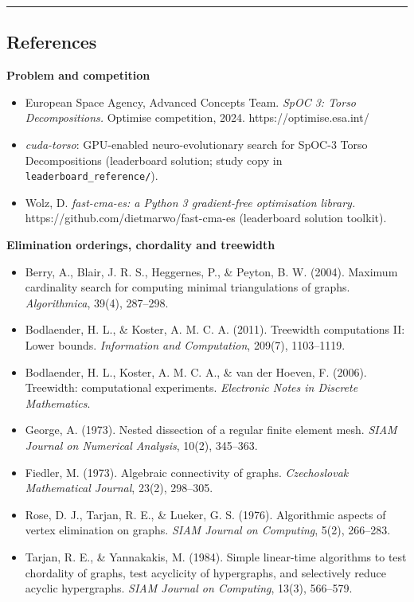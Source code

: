 \documentclass[
  11pt,
]{article}
\providecommand{\tightlist}{%
  \setlength{\itemsep}{0pt}\setlength{\parskip}{0pt}}
\begin{document}
\begin{center}\rule{0.5\linewidth}{0.5pt}\end{center}

\hypertarget{references}{%
\subsection{References}\label{references}}

\textbf{Problem and competition}

\begin{itemize}
\tightlist
\item
  European Space Agency, Advanced Concepts Team. \emph{SpOC 3: Torso
  Decompositions.} Optimise competition, 2024. https://optimise.esa.int/
\item
  \emph{cuda-torso}: GPU-enabled neuro-evolutionary search for SpOC-3
  Torso Decompositions (leaderboard solution; study copy in
  \texttt{leaderboard\_reference/}).
\item
  Wolz, D. \emph{fast-cma-es: a Python 3 gradient-free optimisation
  library.} https://github.com/dietmarwo/fast-cma-es (leaderboard
  solution toolkit).
\end{itemize}

\textbf{Elimination orderings, chordality and treewidth}

\begin{itemize}
\tightlist
\item
  Berry, A., Blair, J. R. S., Heggernes, P., \& Peyton, B. W. (2004).
  Maximum cardinality search for computing minimal triangulations of
  graphs. \emph{Algorithmica}, 39(4), 287--298.
\item
  Bodlaender, H. L., \& Koster, A. M. C. A. (2011). Treewidth
  computations II: Lower bounds. \emph{Information and Computation},
  209(7), 1103--1119.
\item
  Bodlaender, H. L., Koster, A. M. C. A., \& van der Hoeven, F. (2006).
  Treewidth: computational experiments. \emph{Electronic Notes in
  Discrete Mathematics}.
\item
  George, A. (1973). Nested dissection of a regular finite element mesh.
  \emph{SIAM Journal on Numerical Analysis}, 10(2), 345--363.
\item
  Fiedler, M. (1973). Algebraic connectivity of graphs.
  \emph{Czechoslovak Mathematical Journal}, 23(2), 298--305.
\item
  Rose, D. J., Tarjan, R. E., \& Lueker, G. S. (1976). Algorithmic
  aspects of vertex elimination on graphs. \emph{SIAM Journal on
  Computing}, 5(2), 266--283.
\item
  Tarjan, R. E., \& Yannakakis, M. (1984). Simple linear-time algorithms
  to test chordality of graphs, test acyclicity of hypergraphs, and
  selectively reduce acyclic hypergraphs. \emph{SIAM Journal on
  Computing}, 13(3), 566--579.
\end{itemize}
\end{document}
